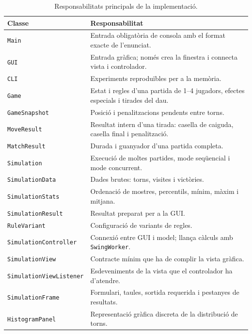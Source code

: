 \documentclass[conference,compsoc]{IEEEtran}
\begin{document}
\begin{table}[H]
\centering
\caption{Responsabilitats principals de la implementació.}
\label{tab:classes}
\scriptsize
\begin{tabular}{@{}p{}p{}@{}}
\toprule
Classe & Responsabilitat \\
\midrule
\texttt{Main} & Entrada obligatòria de consola amb el format exacte de l'enunciat. \\
\texttt{GUI} & Entrada gràfica; només crea la finestra i connecta vista i controlador. \\
\texttt{CLI} & Experiments reproduïbles per a la memòria. \\
\texttt{Game} & Estat i regles d'una partida de 1--4 jugadors, efectes especials i tirades del dau. \\
\texttt{GameSnapshot} & Posició i penalitzacions pendents entre torns. \\
\texttt{MoveResult} & Resultat intern d'una tirada: casella de caiguda, casella final i penalització. \\
\texttt{MatchResult} & Durada i guanyador d'una partida completa. \\
\texttt{Simulation} & Execució de moltes partides, mode seqüencial i mode concurrent. \\
\texttt{SimulationData} & Dades brutes: torns, visites i victòries. \\
\texttt{SimulationStats} & Ordenació de mostres, percentils, mínim, màxim i mitjana. \\
\texttt{SimulationResult} & Resultat preparat per a la GUI. \\
\texttt{RuleVariant} & Configuració de variants de regles. \\
\texttt{SimulationController} & Connexió entre GUI i model; llança càlculs amb \texttt{SwingWorker}. \\
\texttt{SimulationView} & Contracte mínim que ha de complir la vista gràfica. \\
\texttt{SimulationViewListener} & Esdeveniments de la vista que el controlador ha d'atendre. \\
\texttt{SimulationFrame} & Formulari, taules, sortida requerida i pestanyes de resultats. \\
\texttt{HistogramPanel} & Representació gràfica discreta de la distribució de torns. \\
\bottomrule
\end{tabular}
\end{table}
\end{document}
